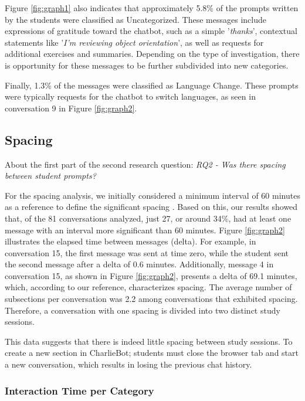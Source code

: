 \documentclass[a4paper,twoside]{article}
\begin{document}
Figure \ref{fig:graph1} also indicates that approximately 5.8\% of the prompts
written by the students were classified as Uncategorized. These messages include
expressions of gratitude toward the chatbot, such as a simple '\textit{thanks}',
contextual statements like '\textit{I'm reviewing object orientation}', as well
as requests for additional exercises and summaries. Depending on the type of
investigation, there is opportunity for these messages to be further subdivided
into new categories.

Finally, 1.3\% of the messages were classified as Language Change. These prompts
were typically requests for the chatbot to switch languages, as seen in
conversation 9 in Figure \ref{fig:graph2}.

\subsection{Spacing}

About the first part of the second research question: \textit{RQ2 - Was there
spacing between student prompts?}

For the spacing analysis, we initially considered a minimum interval of 60
minutes as a reference to define the significant spacing \citep{Gadella24}.
Based on this, our results showed that, of the 81 conversations analyzed, just
27, or around 34\%, had at least one message with an interval more significant
than 60 minutes. Figure \ref{fig:graph2} illustrates the elapsed time between
messages (delta). For example, in conversation 15, the first message was sent
at time zero, while the student sent the second message after a delta of 0.6
minutes. Additionally, message 4 in conversation 15, as shown in Figure
\ref{fig:graph2}, presents a delta of 69.1 minutes, which, according to our
reference, characterizes spacing. The average number of subsections per
conversation was 2.2 among conversations that exhibited spacing. Therefore, a
conversation with one spacing is divided into two distinct study sessions.

This data suggests that there is indeed little spacing between study sessions.
To create a new section in CharlieBot; students must close the browser tab and
start a new conversation, which results in losing the previous chat history.

\subsubsection{Interaction Time per Category}
\end{document}
